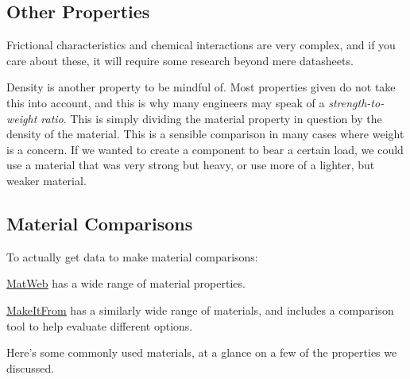 \documentclass[10pt,letterpaper]{book}
\begin{document}
\subsection{Other Properties} 
 
 Frictional characteristics and chemical interactions are very complex, and if you care about these, it will require some research beyond mere datasheets.
 
 Density is another property to be mindful of. Most properties given do not take this into account, and this is why many engineers may speak of a \textit{strength-to-weight ratio}. This is simply dividing the material property in question by the density of the material. This is a sensible comparison in many cases where weight is a concern. If we wanted to create a component to bear a certain load, we could use a material that was very strong but heavy, or use more of a lighter, but weaker material.
 
 \subsection{Material Comparisons}
 
 To actually get data to make material comparisons:
 \begin{asparaitem}
 	\item \href{http://www.matweb.com/search/DataSheet.aspx?MatGUID=3a2e111b27ef4e5d813bad6044b3f318&ckck=1}{\color{red}\underline{MatWeb}} has a wide range of material properties.
 	\item \href{https://www.makeitfrom.com/}{\color{red}\underline{MakeItFrom}} has a similarly wide range of materials, and includes a comparison tool to help evaluate different options.
 \end{asparaitem}
 
 Here's some commonly used materials, at a glance on a few of the properties we discussed.
 
\end{document}
